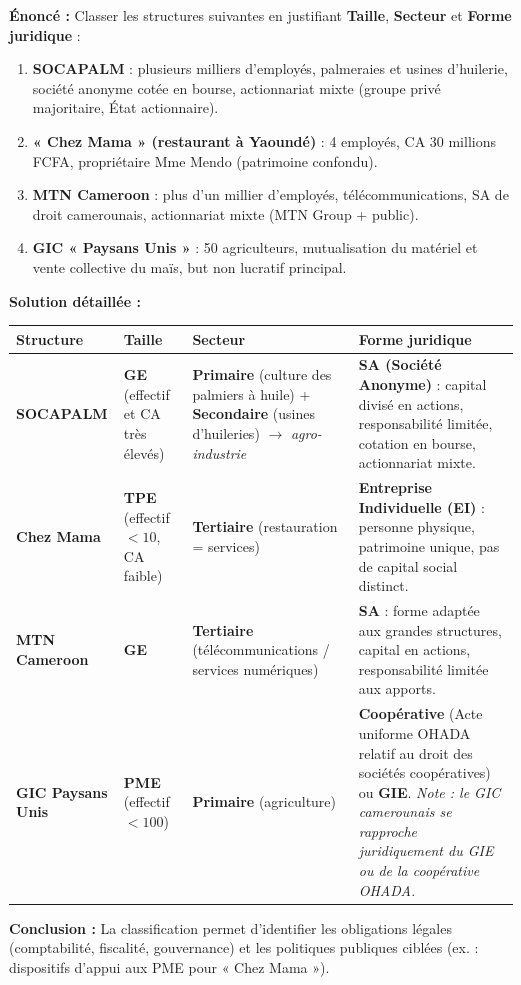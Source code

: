 \documentclass[11pt]{article}
\begin{document}
\begin{exoresolu}
    \textbf{Énoncé :} Classer les structures suivantes en justifiant \textbf{Taille}, \textbf{Secteur} et \textbf{Forme juridique} :
    \begin{enumerate}
        \item \textbf{SOCAPALM} : plusieurs milliers d'employés, palmeraies et usines d'huilerie, société anonyme cotée en bourse, actionnariat mixte (groupe privé majoritaire, État actionnaire).
        \item \textbf{« Chez Mama » (restaurant à Yaoundé)} : 4 employés, CA 30 millions FCFA, propriétaire Mme Mendo (patrimoine confondu).
        \item \textbf{MTN Cameroon} : plus d'un millier d'employés, télécommunications, SA de droit camerounais, actionnariat mixte (MTN Group + public).
        \item \textbf{GIC « Paysans Unis »} : 50 agriculteurs, mutualisation du matériel et vente collective du maïs, but non lucratif principal.
    \end{enumerate}
    \tcblower
    \textbf{Solution détaillée :}
    \begin{center}
    \begin{tabularx}{\linewidth}{|l|X|X|X|}\hline
    \rowcolor{popblueL}
    \textbf{Structure} & \textbf{Taille} & \textbf{Secteur} & \textbf{Forme juridique} \\ \hline
    \textbf{SOCAPALM} & \textbf{GE} (effectif et CA très élevés) & \textbf{Primaire} (culture des palmiers à huile) + \textbf{Secondaire} (usines d'huileries) $\to$ \emph{agro-industrie} & \textbf{SA (Société Anonyme)} : capital divisé en actions, responsabilité limitée, cotation en bourse, actionnariat mixte. \\ \hline
    \textbf{Chez Mama} & \textbf{TPE} (effectif $< 10$, CA faible) & \textbf{Tertiaire} (restauration = services) & \textbf{Entreprise Individuelle (EI)} : personne physique, patrimoine unique, pas de capital social distinct. \\ \hline
    \textbf{MTN Cameroon} & \textbf{GE} & \textbf{Tertiaire} (télécommunications / services numériques) & \textbf{SA} : forme adaptée aux grandes structures, capital en actions, responsabilité limitée aux apports. \\ \hline
    \textbf{GIC Paysans Unis} & \textbf{PME} (effectif $< 100$) & \textbf{Primaire} (agriculture) & \textbf{Coopérative} (Acte uniforme OHADA relatif au droit des sociétés coopératives) ou \textbf{GIE}. \emph{Note : le GIC camerounais se rapproche juridiquement du GIE ou de la coopérative OHADA.} \\ \hline
    \end{tabularx}
    \end{center}
    \textbf{Conclusion :} La classification permet d'identifier les obligations légales (comptabilité, fiscalité, gouvernance) et les politiques publiques ciblées (ex. : dispositifs d'appui aux PME pour « Chez Mama »).
\end{exoresolu}
\end{document}
